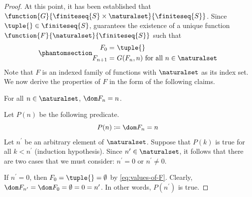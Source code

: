 \begin{proof}
    \vspace{0.3cm}
    \noindent
    At this point, it has been established that \( \function{G}{\finiteseq{S} \times \naturalset}{\finiteseq{S}} \).
    Since \( \tuple{} \in \finiteseq{S} \),  guarantees
    the existence of a unique function \( \function{F}{\naturalset}{\finiteseq{S}} \) such that
    \begin{equation}
        \phantomsection \label{eq:values-of-F}
        \begin{aligned}
            F_{0}     = &\\
            F_{n + 1} = & \\
        \end{aligned}
        \begin{aligned}
            &\ \tuple{} \\
            &\ G(F_{n}, n) \ \text{for all \( n \in \naturalset \)}
        \end{aligned}
    \end{equation}
    Note that \( F \) is an indexed family of functions with \( \naturalset \) as its index set.
    We now derive the properties of \( F \) in the form of the following claims.
    \begin{claim}
         \label{claim:F-n-has-n-as-its-domain}
        For all \( n \in \naturalset \), \( \dom F_{n} = n \).
    \end{claim}
    \noindent
    Let \( P(n) \) be the following predicate.
    \begin{equation*}
        P(n) \coloneq \dom F_{n} = n
    \end{equation*}
    Let \( n^{\prime} \) be an arbitrary element of \( \naturalset \).
    Suppose that \( P(k) \) is true for all \( k < n^{\prime} \) (induction hypothesis).
    Since \( n^{\prime} \in \naturalset \), it follows that there are two cases that we must consider:
    \( n^{\prime} = 0 \) or \( n^{\prime} \neq 0 \).

    \vspace{0.3cm}
    \noindent
    If \( n^{\prime} = 0 \), then \( F_{0} = \tuple{} = \emptyset \) by \eqref{eq:values-of-F}.
    Clearly, \( \dom F_{n^{\prime}} = \dom F_{0} = \emptyset = 0 = n^{\prime} \).
    In other words, \( P(n^{\prime}) \) is true.


\end{proof}
